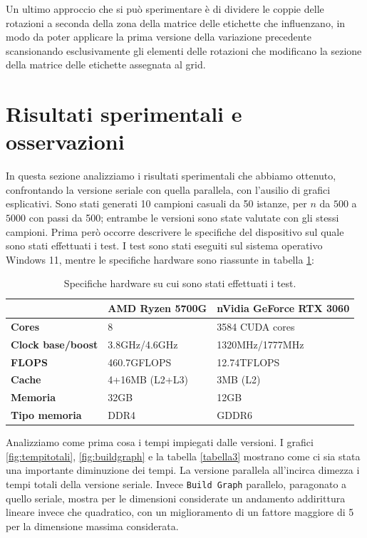 \documentclass[12pt]{article}
\begin{document}
    Un ultimo approccio che si può sperimentare è di dividere le coppie delle rotazioni a seconda della zona della matrice delle etichette che influenzano, in modo da poter applicare la prima versione della variazione precedente scansionando esclusivamente gli elementi delle rotazioni che modificano la sezione della matrice delle etichette assegnata al grid.

\pagebreak

\section{Risultati sperimentali e osservazioni}
    In questa sezione analizziamo i risultati sperimentali che abbiamo ottenuto, confrontando la versione seriale con quella parallela, con l'ausilio di grafici esplicativi. Sono stati generati 10 campioni casuali da 50 istanze, per $n$ da $500$ a $5000$ con passi da 500; entrambe le versioni sono state valutate con gli stessi campioni. Prima però occorre descrivere le specifiche del dispositivo sul quale sono stati effettuati i test. I test sono stati eseguiti sul sistema operativo Windows 11, mentre le specifiche hardware sono riassunte in tabella \ref{tabella2}:

    \begin{table}[h]
    \centering
    \begin{tabular}{|l|l|l|}
        \hline
        & \textbf{AMD Ryzen 5700G} & \textbf{nVidia GeForce RTX 3060} \\
        \hline
        \textbf{Cores} & 8 & 3584 CUDA cores \\
        \hline
        \textbf{Clock base/boost} & 3.8GHz/4.6GHz & 1320MHz/1777MHz \\
        \hline
        \textbf{FLOPS} & 460.7GFLOPS & 12.74TFLOPS \\
        \hline
        \textbf{Cache} & 4+16MB (L2+L3) & 3MB (L2) \\
        \hline
        \textbf{Memoria} & 32GB & 12GB \\
        \hline
        \textbf{Tipo memoria} & DDR4 & GDDR6 \\
        \hline
    \end{tabular}
    \caption{Specifiche hardware su cui sono stati effettuati i test.}
    \label{tabella2}
    \end{table}

    \FloatBarrier

    Analizziamo come prima cosa i tempi impiegati dalle versioni. I grafici \ref{fig:tempitotali}, \ref{fig:buildgraph} e la tabella \ref{tabella3} mostrano come ci sia stata una importante diminuzione dei tempi. La versione parallela all'incirca dimezza i tempi totali della versione seriale. Invece \texttt{Build Graph} parallelo, paragonato a quello seriale, mostra per le dimensioni considerate un andamento addirittura lineare invece che quadratico, con un miglioramento di un fattore maggiore di 5 per la dimensione massima considerata.
\end{document}
